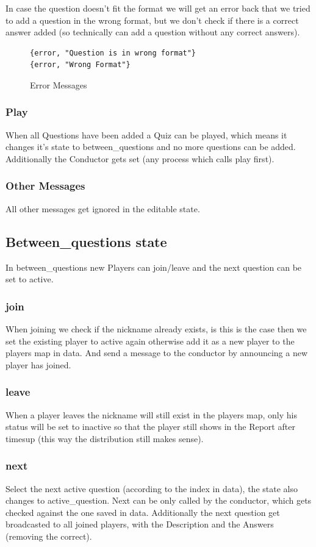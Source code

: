 \documentclass[12pt,a4paper]{article}
\begin{document}
In case the question doesn't fit the format we will get an error back that we tried to add a question in the wrong format, but we don't check if there is a correct answer added (so technically can add a question without any correct answers).
\begin{figure}[!htb]
\begin{verbatim}
{error, "Question is in wrong format"}
{error, "Wrong Format"}
\end{verbatim}
\caption{Error Messages}
\end{figure}

\subsubsection{Play}
When all Questions have been added a Quiz can be played, which means it changes it's state to between\_questions and no more questions can be added.
Additionally the Conductor gets set (any process which calls play first).

\subsubsection{Other Messages}
All other messages get ignored in the editable state.

\subsection{Between\_questions state}
In between\_questions new Players can join/leave and the next question can be set to active.

\subsubsection{join}
When joining we check if the nickname already exists, is this is the case then we set the existing player to active again otherwise add it as a new player to the players map in data.
And send a message to the conductor by announcing a new player has joined.

\subsubsection{leave}
When a player leaves the nickname will still exist in the players map, only his status will be set to inactive so that the player still shows in the Report after timesup (this way the distribution still makes sense).

\subsubsection{next}
Select the next active question (according to the index in data), the state also changes to active\_question.
Next can be only called by the conductor, which gets checked against the one saved in data.
Additionally the next question get broadcasted to all joined players, with the Description and the Answers (removing the correct).
\end{document}
